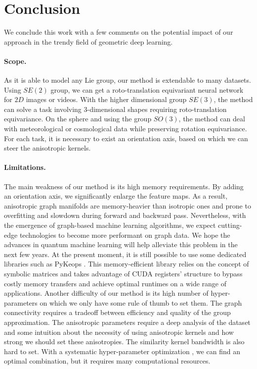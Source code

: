 \documentclass{article}
\begin{document}
\section{Conclusion} \label{sec:conclusion}

We conclude this work with a few comments on the potential impact of our approach in the trendy field of geometric deep learning.

\paragraph{Scope.} As it is able to model any Lie group, our method is extendable to many datasets. Using $SE(2)$ group, we can get a roto-translation equivariant neural network for $2D$ images or videos. With the higher dimensional group $SE(3)$, the method can solve a task involving 3-dimensional shapes requiring roto-translation equivariance. On the sphere and using the group $SO(3)$, the method can deal with meteorological or cosmological data while preserving rotation equivariance. For each task, it is necessary to exist an orientation axis, based on which we can steer the anisotropic kernels.

\paragraph{Limitations.} The main weakness of our method is its high memory requirements. By adding an orientation axis, we significantly enlarge the feature maps. As a result, anisotropic graph manifolds are memory-heavier than isotropic ones and prone to overfitting and slowdown during forward and backward pass. Nevertheless, with the emergence of graph-based machine learning algorithms, we expect cutting-edge technologies to become more performant on graph data. We hope the advances in quantum machine learning will help alleviate this problem in the next few years. At the present moment, it is still possible to use some dedicated libraries such as PyKeops \citep{charlier2020kernel}. This memory-efficient library relies on the concept of symbolic matrices and takes advantage of CUDA registers' structure to bypass costly memory transfers and achieve optimal runtimes on a wide range of applications. Another difficulty of our method is its high number of hyper-parameters on which we only have some rule of thumb to set them. The graph connectivity requires a tradeoff between efficiency and quality of the group approximation. The anisotropic parameters require a deep analysis of the dataset and some intuition about the necessity of using anisotropic kernels and how strong we should set these anisotropies. The similarity kernel bandwidth is also hard to set. With a systematic hyper-parameter optimization \citep{yu2020hyper}, we can find an optimal combination, but it requires many computational resources.
\end{document}
